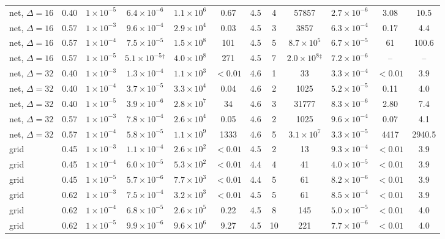 \begin{table}[t]
\begin{ruledtabular}
\begin{tabular}{lcc|cccc|ccccc}
net, $\Delta=16$ & 0.40 & $1\times10^{-5}$ & $6.4\times10^{-6}$ & $1.1\times10^{6}$ & 0.67 & 4.5 & 4 & 57857 & $2.7\times10^{-6}$ & 3.08 & 10.5 \\
net, $\Delta=16$ & 0.57 & $1\times10^{-3}$ & $9.6\times10^{-4}$ & $2.9\times10^{4}$ & 0.03 & 4.5 & 3 & 3857 & $6.3\times10^{-4}$ & 0.17 & 4.4 \\
net, $\Delta=16$ & 0.57 & $1\times10^{-4}$ & $7.5\times10^{-5}$ & $1.5\times10^{8}$ & 101 & 4.5 & 5 & $8.7\times10^{5}$ & $6.7\times10^{-5}$ & 61 & 100.6 \\
net, $\Delta=16$ & 0.57 & $1\times10^{-5}$ & $5.1\times10^{-5}$$^{\dagger}$ & $4.0\times10^{8}$ & 271 & 4.5 & 7 & $2.0\times10^{8}$$^{\ddagger}$ & $7.2\times10^{-6}$ & -- & -- \\
net, $\Delta=32$ & 0.40 & $1\times10^{-3}$ & $1.3\times10^{-4}$ & $1.1\times10^{3}$ & $<0.01$ & 4.6 & 1 & 33 & $3.3\times10^{-4}$ & $<0.01$ & 3.9 \\
net, $\Delta=32$ & 0.40 & $1\times10^{-4}$ & $3.7\times10^{-5}$ & $3.3\times10^{4}$ & 0.04 & 4.6 & 2 & 1025 & $5.2\times10^{-5}$ & 0.11 & 4.0 \\
net, $\Delta=32$ & 0.40 & $1\times10^{-5}$ & $3.9\times10^{-6}$ & $2.8\times10^{7}$ & 34 & 4.6 & 3 & 31777 & $8.3\times10^{-6}$ & 2.80 & 7.4 \\
net, $\Delta=32$ & 0.57 & $1\times10^{-3}$ & $7.8\times10^{-4}$ & $2.6\times10^{4}$ & 0.05 & 4.6 & 2 & 1025 & $9.6\times10^{-4}$ & 0.07 & 4.1 \\
net, $\Delta=32$ & 0.57 & $1\times10^{-4}$ & $5.8\times10^{-5}$ & $1.1\times10^{9}$ & 1333 & 4.6 & 5 & $3.1\times10^{7}$ & $3.3\times10^{-5}$ & 4417 & 2940.5 \\
grid & 0.45 & $1\times10^{-3}$ & $1.1\times10^{-4}$ & $2.6\times10^{2}$ & $<0.01$ & 4.5 & 2 & 13 & $9.3\times10^{-4}$ & $<0.01$ & 3.9 \\
grid & 0.45 & $1\times10^{-4}$ & $6.0\times10^{-5}$ & $5.3\times10^{2}$ & $<0.01$ & 4.4 & 4 & 41 & $4.0\times10^{-5}$ & $<0.01$ & 3.9 \\
grid & 0.45 & $1\times10^{-5}$ & $5.7\times10^{-6}$ & $7.7\times10^{3}$ & $<0.01$ & 4.4 & 5 & 61 & $8.2\times10^{-6}$ & $<0.01$ & 3.9 \\
grid & 0.62 & $1\times10^{-3}$ & $7.5\times10^{-4}$ & $3.2\times10^{3}$ & $<0.01$ & 4.5 & 5 & 61 & $8.5\times10^{-4}$ & $<0.01$ & 3.9 \\
grid & 0.62 & $1\times10^{-4}$ & $6.8\times10^{-5}$ & $2.6\times10^{5}$ & 0.22 & 4.5 & 8 & 145 & $5.0\times10^{-5}$ & $<0.01$ & 4.0 \\
grid & 0.62 & $1\times10^{-5}$ & $9.9\times10^{-6}$ & $9.6\times10^{6}$ & 9.27 & 4.5 & 10 & 221 & $7.7\times10^{-6}$ & $<0.01$ & 4.0 \\
\end{tabular}
\end{ruledtabular}
\end{table}
